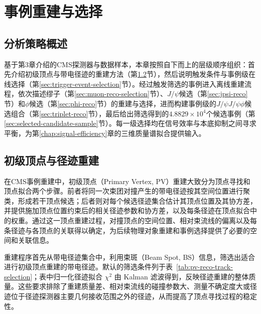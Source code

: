 \chapter{事例重建与选择}
\label{chap:reconstruction-selection}

\section{分析策略概述}
\label{sec:analysis-overview}


基于第3章介绍的CMS探测器与数据样本，本章按照自下而上的层级顺序组织：首先介绍初级顶点与带电径迹的重建方法（第\ref{sec:pv-track-reco}节），然后说明触发条件与事例级在线选择（第\ref{sec:trigger-event-selection}节）。经过触发筛选的事例进入离线重建流程，依次描述缪子（第\ref{sec:muon-reco-selection}节）、$J/\psi$候选（第\ref{sec:jpsi-reco}节）和$\phi$候选（第\ref{sec:phi-reco}节）的重建与选择，进而构建事例级的$J/\psi J/\psi\phi$候选组合（第\ref{sec:triplet-reco}节），最后给出筛选得到的$4.8829\times10^4$个候选事例（第\ref{sec:selected-candidate-sample}节）。每一级选择均在信号效率与本底抑制之间寻求平衡，为第\ref{chap:signal-efficiency}章的三维质量谱拟合提供输入。

\section{初级顶点与径迹重建}
\label{sec:pv-track-reco}

在CMS事例重建中，初级顶点（Primary Vertex, PV）重建大致分为顶点寻找和顶点拟合两个步骤。前者将同一次束团对撞产生的带电径迹按其空间位置进行聚类，形成若干顶点候选；后者则对每个候选径迹集合估计其顶点位置及其协方差，并提供施加顶点位置约束后的相关径迹参数和协方差，以及每条径迹在顶点拟合中的权重。通过这一顶点重建过程，对撞顶点的空间位置、相对束流线的偏离以及每条径迹与各顶点的关联得以确定，为后续物理对象重建和事例选择提供了必要的空间和关联信息。

重建程序首先从带电径迹集合中，利用束斑（Beam Spot, BS）信息，筛选出适合进行初级顶点重建的带电径迹。默认的筛选条件列于表~\ref{tab:pv-reco-track-selection}；表中归一化径迹拟合 $\chi^2$ 由 Kalman 滤波得到，反映径迹重建的整体质量。这些要求排除了重建质量差、相对束流线的碰撞参数大、测量不确定度大或径迹位于径迹探测器主要几何接收范围之外的径迹，从而提高了顶点寻找过程的稳定性。

